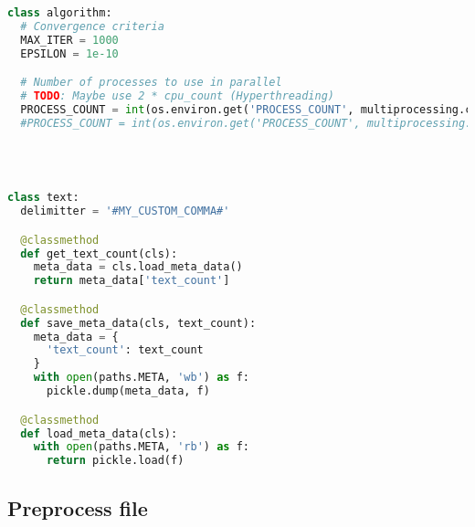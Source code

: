 \begin{lstlisting}[language=python]
class algorithm:
  # Convergence criteria
  MAX_ITER = 1000
  EPSILON = 1e-10

  # Number of processes to use in parallel
  # TODO: Maybe use 2 * cpu_count (Hyperthreading)
  PROCESS_COUNT = int(os.environ.get('PROCESS_COUNT', multiprocessing.cpu_count()))
  #PROCESS_COUNT = int(os.environ.get('PROCESS_COUNT', multiprocessing.cpu_count() * 2))




class text:
  delimitter = '#MY_CUSTOM_COMMA#'

  @classmethod
  def get_text_count(cls):
    meta_data = cls.load_meta_data()
    return meta_data['text_count']

  @classmethod
  def save_meta_data(cls, text_count):
    meta_data = {
      'text_count': text_count
    }
    with open(paths.META, 'wb') as f:
      pickle.dump(meta_data, f)

  @classmethod
  def load_meta_data(cls):
    with open(paths.META, 'rb') as f:
      return pickle.load(f)
\end{lstlisting}


\subsection{Preprocess file}
\label{app:preprocess}

